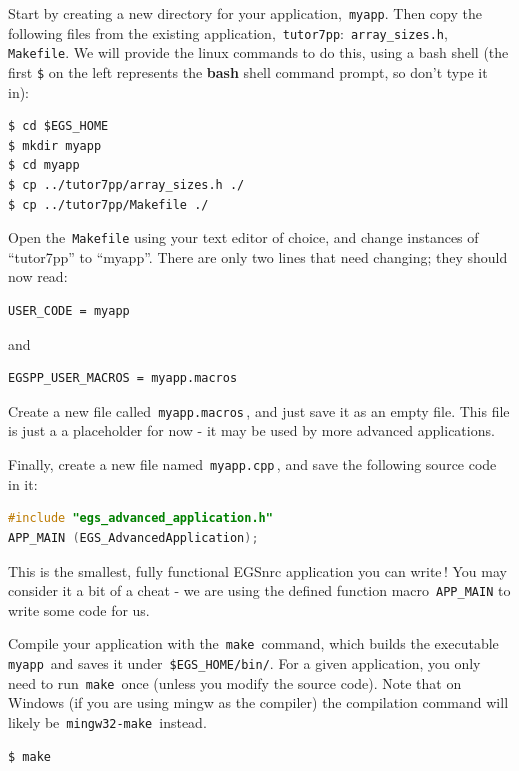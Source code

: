 \documentclass[12pt,twoside]{article}
\begin{document}
Start by creating a new directory for your application, \,\Verb|myapp|.
Then copy the following files from the existing application, \,\Verb|tutor7pp|: \,\Verb|array_sizes.h|, \,\Verb|Makefile|.
We will provide the linux commands to do this, using a bash shell
(the first \Verb|$| on the left represents the \textbf{bash} shell command prompt,
so don't type it in):

\begin{lstlisting}
$ cd $EGS_HOME
$ mkdir myapp
$ cd myapp
$ cp ../tutor7pp/array_sizes.h ./
$ cp ../tutor7pp/Makefile ./
\end{lstlisting}

Open the \,\Verb|Makefile| using your text editor of choice, and change
instances of ``tutor7pp'' to ``myapp''. There are only two lines that need
changing; they should now read:

\begin{lstlisting}
USER_CODE = myapp
\end{lstlisting}

and

\begin{lstlisting}
EGSPP_USER_MACROS = myapp.macros
\end{lstlisting}

Create a new file called \,\Verb|myapp.macros|\,, and just save it as an empty
file. This file is just a a placeholder for now - it may be used by
more advanced applications.

Finally, create a new file named \,\Verb|myapp.cpp|\,, and save the following
source code in it:

\begin{lstlisting}[language=c++,backgroundcolor=\color{white}]
#include "egs_advanced_application.h"
APP_MAIN (EGS_AdvancedApplication);
\end{lstlisting}

This is the smallest, fully functional EGSnrc application you can write\,!
You may consider it a bit of a cheat - we are using the defined function macro
\,\Verb|APP_MAIN| to write some code for us.

Compile your application with the \,\Verb|make|\, command, which builds the
executable \,\Verb|myapp|\, and saves it under \,\Verb|$EGS_HOME/bin/|. For a
given application, you only need to run \,\Verb|make|\, once
(unless you modify the source code). Note that on Windows (if you are using
mingw as the compiler) the compilation command will likely be
\,\Verb|mingw32-make|\, instead.
\begin{lstlisting}
$ make
\end{lstlisting}
\end{document}
